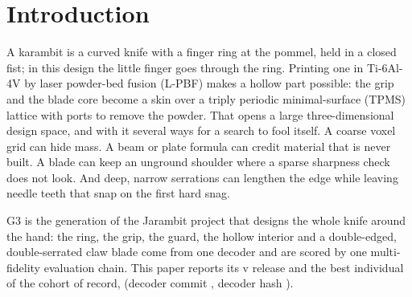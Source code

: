 \section{Introduction}\label{sec:intro}
A karambit is a curved knife with a finger ring at the pommel, held in a closed fist; in this design the little finger
goes through the ring. Printing one in Ti-6Al-4V by laser powder-bed fusion (L-PBF) makes a hollow part possible: the
grip and the blade core become a skin over a triply periodic minimal-surface (TPMS) lattice with ports to remove the
powder. That opens a large three-dimensional design space, and with it several ways for a search to fool itself. A
coarse voxel grid can hide mass. A beam or plate formula can credit material that is never built. A blade can keep an
unground shoulder where a sparse sharpness check does not look. And deep, narrow serrations can lengthen the edge while
leaving needle teeth that snap on the first hard snag.

G3 is the generation of the Jarambit project that designs the whole knife around the hand: the ring, the grip, the
guard, the hollow interior and a double-edged, double-serrated claw blade come from one decoder and are scored by one
multi-fidelity evaluation chain. This paper reports its v\gVersion{} release and the best individual of the cohort of
record, \gDesign{} (decoder commit \gCommit, decoder hash \gDecoder).

